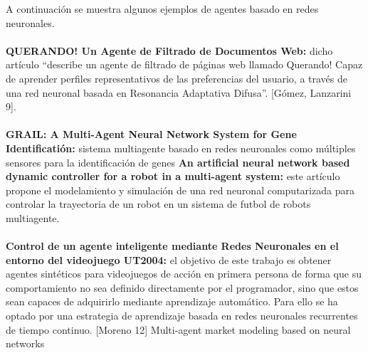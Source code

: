 A continuación se muestra algunos ejemplos de agentes basado en redes neuronales.
\\\\
\textbf{ QUERANDO! Un Agente de Filtrado de Documentos Web:} dicho artículo “describe un agente de filtrado de páginas web llamado Querando! Capaz de aprender perfiles representativos de las preferencias del usuario, a través de una red neuronal basada en Resonancia Adaptativa Difusa”. [Gómez, Lanzarini 9].
\\\\
\textbf{GRAIL: A Multi-Agent Neural Network System for Gene Identificatión:} sistema multiagente basado en redes neuronales como múltiples sensores para la identificación de genes 
\textbf{An artificial neural network based dynamic controller for a robot in a multi-agent system:} este artículo propone el modelamiento y simulación de una red neuronal computarizada para controlar la trayectoria de un robot en un sistema de futbol de robots multiagente. 
\\\\
\textbf{Control de un agente inteligente mediante Redes Neuronales en el entorno del videojuego UT2004:}  el objetivo de este trabajo es obtener agentes sintéticos para videojuegos de acción en primera persona de forma que su comportamiento no sea definido directamente por el programador, sino que estos sean capaces de adquirirlo mediante aprendizaje automático. Para ello se ha optado por una estrategia de aprendizaje basada en redes neuronales recurrentes de tiempo continuo. [Moreno 12]
Multi-agent market modeling based on neural networks
		